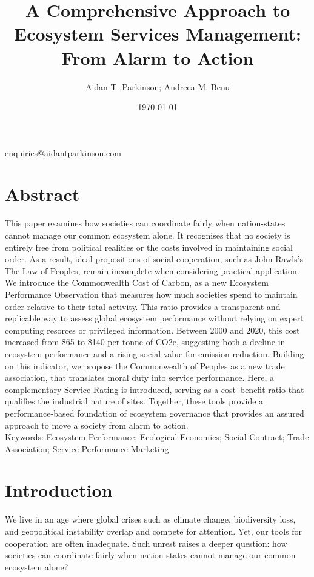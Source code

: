 \documentclass[12pt, oneside]{article}   	%
\title{A Comprehensive Approach to Ecosystem Services Management: From Alarm to Action}
\author{Aidan T. Parkinson; Andreea M. Benu}
\date{\today}							%
\begin{document}
\maketitle
\begin{center}
\href{mailto:enquiries@aidantparkinson.com}{enquiries@aidantparkinson.com}
\end{center}

\section{Abstract}
This paper examines how societies can coordinate fairly when nation-states cannot manage our common ecosystem alone.
It recognises that no society is entirely free from political realities or the costs involved in maintaining social order.
As a result, ideal propositions of social cooperation, such as John Rawls’s The Law of Peoples, remain incomplete when considering practical application.
We introduce the Commonwealth Cost of Carbon, as a new Ecosystem Performance Observation that measures how much societies spend to maintain order relative to their total activity.
This ratio provides a transparent and replicable way to assess global ecosystem performance without relying on expert computing resorces or privileged information.
Between 2000 and 2020, this cost increased from \$65 to \$140 per tonne of CO2e, suggesting both a decline in ecosystem performance and a rising social value for emission reduction.
Building on this indicator, we propose the Commonwealth of Peoples as a new trade association, that translates moral duty into service performance.
Here, a complementary Service Rating is introduced, serving as a cost–benefit ratio that qualifies the industrial nature of sites.
Together, these tools provide a performance-based foundation of ecosystem governance that provides an assured approach to move a society from alarm to action.\\

Keywords: Ecosystem Performance; Ecological Economics; Social Contract; Trade Association; Service Performance Marketing\\

\section{Introduction}

We live in an age where global crises such as climate change, biodiversity loss, and geopolitical instability overlap and compete for attention.
Yet, our tools for cooperation are often inadequate.
Such unrest raises a deeper question: how societies can coordinate fairly when nation-states cannot manage our common ecosystem alone?\\
\end{document}
